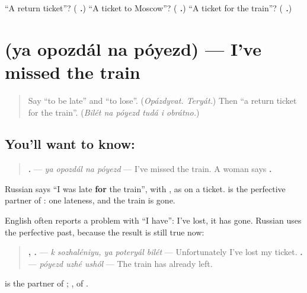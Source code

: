 \begin{tcolorbox}[breakable,colback=teal!4,colframe=teal!35!black,title={Before you move on}]
\textquotedblleft{}A return ticket\textquotedblright{}? (\emph{\textbf{   .}}) \textquotedblleft{}A ticket to Moscow\textquotedblright{}? (\emph{\textbf{  .}}) \textquotedblleft{}A ticket for the train\textquotedblright{}? (\emph{\textbf{  .}})
\end{tcolorbox}
\section[\texorpdfstring{\ru{я} \ru{опоздал} \ru{на} \ru{поезд} (ya opozdál na …)}{я опоздал на поезд (ya opozdál na …)}]{    (ya opozdál na póyezd) — I've missed the train}

\label{lesson:RU-C266-opozdal}



\begin{quote}
Say \textquotedblleft{}to be late\textquotedblright{} and \textquotedblleft{}to lose\textquotedblright{}. (\emph{Opázdyvat. Teryát.}) Then \textquotedblleft{}a return ticket for the train\textquotedblright{}. (\emph{Bilét na póyezd tudá i obrátno.})
\end{quote}

\subsection*{You'll want to know:    }
\begin{quote}
\textbf{   .} — \emph{ya opozdál na póyezd} — I've missed the train. A woman says \textbf{   .}
\end{quote}

Russian says \textquotedblleft{}I was late \textbf{for} the train\textquotedblright{}, with \textbf{}, as on a ticket. \textbf{} is the perfective partner of \emph{}: one lateness, and the train is gone.

\begin{grammarlens}[title={Grammar Lens: a problem is a result}]
English often reports a problem with \textquotedblleft{}I have\textquotedblright{}: I've lost, it has gone. Russian uses the perfective past, because the result is still true now:

\begin{quote}
\textbf{ ,   .} — \emph{k sozhaléniyu, ya poteryál bilét} — Unfortunately I've lost my ticket. \textbf{  .} — \emph{póyezd uzhé ushól} — The train has already left.
\end{quote}

\textbf{} is the partner of \emph{}; \textbf{}, of \emph{}.
\end{grammarlens}

